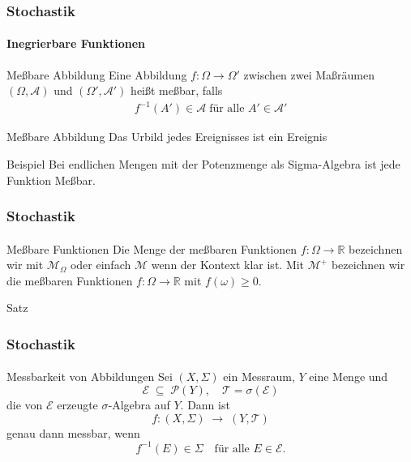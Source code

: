 \documentclass{beamer}
\newcommand{\EE}{\mathcal{E}}
\newcommand{\Tau}{\mathcal{T}}
\begin{document}
  
 \begin{frame}
    \frametitle{Stochastik}
\framesubtitle{Inegrierbare Funktionen}
    \begin{block}{Meßbare Abbildung}
     Eine Abbildung $f:\Omega \to \Omega'$ zwischen zwei Maßräumen 
      $(\Omega, \mathcal{A})$ und $(\Omega', \mathcal{A}')$ heißt meßbar, falls
    \begin{align*}
        f^{-1}(A') \in \mathcal{A} \; \text{für alle } A' \in \mathcal{A}'
    \end{align*}
    \end{block}

    \begin{block}{Meßbare Abbildung}
    Das Urbild jedes Ereignisses ist ein Ereignis
    \end{block}

    \begin{block}{Beispiel}
        Bei endlichen Mengen mit der Potenzmenge als Sigma-Algebra ist jede Funktion Meßbar.
    \end{block}

    
 \end{frame}





\begin{frame}
    \frametitle{Stochastik}
\framesubtitle{}
    \begin{block}{Meßbare Funktionen }
        Die Menge der meßbaren Funktionen $f: \Omega \to \mathbb{R}$ bezeichnen wir mit $\mathcal{M}_\Omega$ oder einfach $\mathcal{M}$
        wenn der Kontext klar ist. 
        Mit $\mathcal{M}^+$ bezeichnen wir die meßbaren Funktionen $f: \Omega \to \mathbb{R}$ mit $f(\omega) \geq 0$. 
    \end{block}

\end{frame}

\begin{frame}{Satz}
    \frametitle{Stochastik}
    \framesubtitle{}
    \begin{block}{Messbarkeit von Abbildungen}
      Sei $(X,\Sigma)$ ein Messraum, $Y$ eine Menge und
      \[
        \EE \;\subseteq\;\mathcal P(Y),
        \quad
        \Tau = \sigma(\EE)
      \]
      die von $\EE$ erzeugte $\sigma$‑Algebra auf $Y$. Dann ist
      \[
        f\colon (X,\Sigma)\;\longrightarrow\;(Y,\Tau)
      \]
      genau dann messbar, wenn
      \[
        f^{-1}(E)\in\Sigma
        \quad\text{für alle }E\in\EE.
      \]
    \end{block}
  \end{frame}
  
\end{document}
